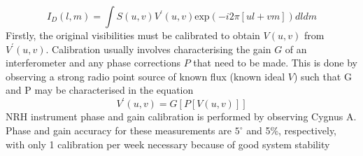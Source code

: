 \begin{equation}
I_D(l,m)=\int S(u,v)V^{'}(u,v)\mathrm{exp}(-i2\pi[ul +vm])dldm
\label{eqn:VS}
\end{equation}
Firstly, the original visibilities must be calibrated to obtain $V(u,v)$ from $V^{'}(u,v)$. Calibration usually involves characterising the gain $G$ of an interferometer and any phase corrections $P$ that need to be made. This is done by observing a strong radio point source of known flux (known ideal $V$) such that G and P may be characterised in the equation
\begin{equation}
V^{'}(u,v) = G[ P[V(u,v)] ]
\end{equation}
NRH instrument phase and gain calibration is performed by observing Cygnus A. Phase and gain accuracy for these measurements are $5^{\circ}$ and 5\%, respectively, with only 1 calibration per week necessary because of good system stability \citep{avignon1989, mercier2009}

